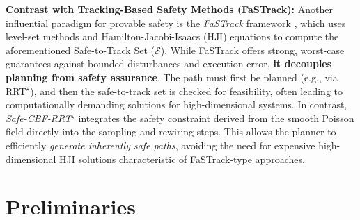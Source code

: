 \documentclass[letterpaper, 10 pt, conference]{ieeeconf}
\begin{document}
\textbf{Contrast with Tracking-Based Safety Methods (FaSTrack):} Another
influential paradigm for provable safety is the \textit{FaSTrack} framework
\cite{Chen_2021}, which uses level-set methods and
Hamilton-Jacobi-Isaacs (HJI) equations to compute the aforementioned
Safe-to-Track Set ($\mathcal{S}$). While FaSTrack offers strong, worst-case
guarantees against bounded disturbances and execution error,
\textbf{it decouples planning from safety assurance}. The path must first be
planned (e.g., via RRT$^\star$), and then the safe-to-track set is checked for
feasibility, often leading to computationally demanding solutions for
high-dimensional systems. In contrast, \textit{Safe-CBF-RRT$^\star$} integrates the
safety constraint derived from the smooth Poisson field directly into the
sampling and rewiring steps. This allows the planner to efficiently
\textit{generate inherently safe paths}, avoiding the need for expensive
high-dimensional HJI solutions characteristic of FaSTrack-type approaches.


\cite{bahati2025dynamicsafetycomplexenvironments}

\section{Preliminaries}
\end{document}
